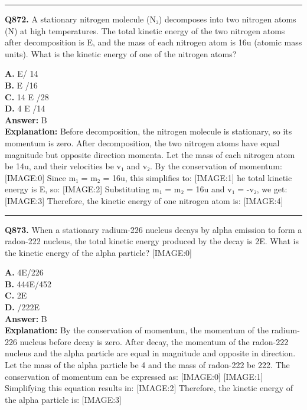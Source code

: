\documentclass[12pt]{article}
\begin{document}
\hrule
\vspace{1em}


\noindent
\textbf{Q872.} A stationary nitrogen molecule (N₂) decomposes into two nitrogen atoms (N) at high temperatures. The total kinetic energy of the two nitrogen atoms after decomposition is E, and the mass of each nitrogen atom is 16u (atomic mass units). What is the kinetic energy of one of the nitrogen atoms?



\textbf{A.} E/
14​ \\
\textbf{B.} E
​/16 \\
\textbf{C.} 14
E
​/28 \\
\textbf{D.} 4
E
​/14 \\

\textbf{Answer:} B \\
\textbf{Explanation:} Before decomposition, the nitrogen molecule is stationary, so its momentum is zero. After decomposition, the two nitrogen atoms have equal magnitude but opposite direction momenta. Let the mass of each nitrogen atom be 14u, and their velocities be v₁ and v₂. By the conservation of momentum:
[IMAGE:0]
Since m₁ = m₂ = 16u, this simplifies to:
[IMAGE:1]
he total kinetic energy is E, so:
[IMAGE:2]
Substituting m₁ = m₂ = 16u and v₁ = -v₂, we get:
[IMAGE:3]
Therefore, the kinetic energy of one nitrogen atom is:
[IMAGE:4]

\hrule
\vspace{1em}


\noindent
\textbf{Q873.} When a stationary radium-226 nucleus decays by alpha emission to form a radon-222 nucleus, the total kinetic energy produced by the decay is 2E. What is the kinetic energy of the alpha particle?
[IMAGE:0]



\textbf{A.} 4E​/226 \\
\textbf{B.} 444E​/452 \\
\textbf{C.} 2E​ \\
\textbf{D.} /222E​ \\

\textbf{Answer:} B \\
\textbf{Explanation:} By the conservation of momentum, the momentum of the radium-226 nucleus before decay is zero. After decay, the momentum of the radon-222 nucleus and the alpha particle are equal in magnitude and opposite in direction. Let the mass of the alpha particle be 4 and the mass of radon-222 be 222. The conservation of momentum can be expressed as:
[IMAGE:0]
[IMAGE:1]
Simplifying this equation results in:
[IMAGE:2]
Therefore, the kinetic energy of the alpha particle is:
[IMAGE:3]
\end{document}
